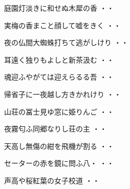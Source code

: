 \begin{shiika}庭園灯淡きに和せぬ木犀の香
\hfill{・・}\end{shiika}
\vspace{0.6cm}
\begin{shiika}実梅の香まこと顔して嘘をきく
\hfill{・・}\end{shiika}
\vspace{0.6cm}
\begin{shiika}夜の仏間大蜘蛛打ちて逃がしけり
\hfill{・・}\end{shiika}
\vspace{0.6cm}
\begin{shiika}耳遠く独りもよしと新茶汲む
\hfill{・・}\end{shiika}
\vspace{0.6cm}
\begin{shiika}魂迎ふやがては迎えらるる吾
\hfill{・・}\end{shiika}
\vspace{0.6cm}
\begin{shiika}帰省子に一夜越し方きかれけり
\hfill{・・}\end{shiika}
\vspace{0.6cm}
\begin{shiika}山荘の冨士見ゆ窓に姫りんご
\hfill{・・}\end{shiika}
\vspace{0.6cm}
\begin{shiika}夜霧匂ふ同郷なりし荘の主
\hfill{・・}\end{shiika}
\vspace{0.6cm}
\begin{shiika}天高し無傷の紺を飛機が割る
\hfill{・・}\end{shiika}
\vspace{0.6cm}
\begin{shiika}セーターの赤を鏡に問ふ八・
\hfill{・・}\end{shiika}
\vspace{0.6cm}
\begin{shiika}声高や桜紅葉の女子校道
\hfill{・・}\end{shiika}
\vspace{0.6cm}
